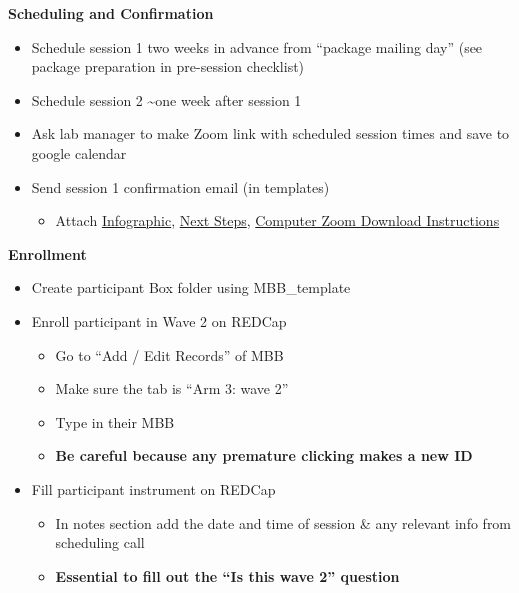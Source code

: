\documentclass[]{book}
\providecommand{\tightlist}{%
  \setlength{\itemsep}{0pt}\setlength{\parskip}{0pt}}
\begin{document}
\textbf{Scheduling and Confirmation}

\begin{itemize}
\item
  Schedule session 1 two weeks in advance from ``package mailing day'' (see package preparation in pre-session checklist)
\item
  Schedule session 2 \textasciitilde{}one week after session 1
\item
  Ask lab manager to make Zoom link with scheduled session times and save to google calendar
\item
  Send session 1 confirmation email (in templates)

  \begin{itemize}
  \tightlist
  \item
    Attach \href{https://app.box.com/file/776654994352}{Infographic}, \href{https://app.box.com/file/774936561660}{Next Steps}, \href{https://ucla.app.box.com/file/680632734387}{Computer Zoom Download Instructions}
  \end{itemize}
\end{itemize}

\textbf{Enrollment}

\begin{itemize}
\tightlist
\item
  Create participant Box folder using MBB\_template\\
\item
  Enroll participant in Wave 2 on REDCap

  \begin{itemize}
  \tightlist
  \item
    Go to ``Add / Edit Records'' of MBB
  \item
    Make sure the tab is ``Arm 3: wave 2''
  \item
    Type in their MBB
  \item
    \textbf{Be careful because any premature clicking makes a new ID}
  \end{itemize}
\item
  Fill participant instrument on REDCap

  \begin{itemize}
  \tightlist
  \item
    In notes section add the date and time of session \& any relevant info from scheduling call\\
  \item
    \textbf{Essential to fill out the ``Is this wave 2'' question}
  \end{itemize}
\end{itemize}
\end{document}
